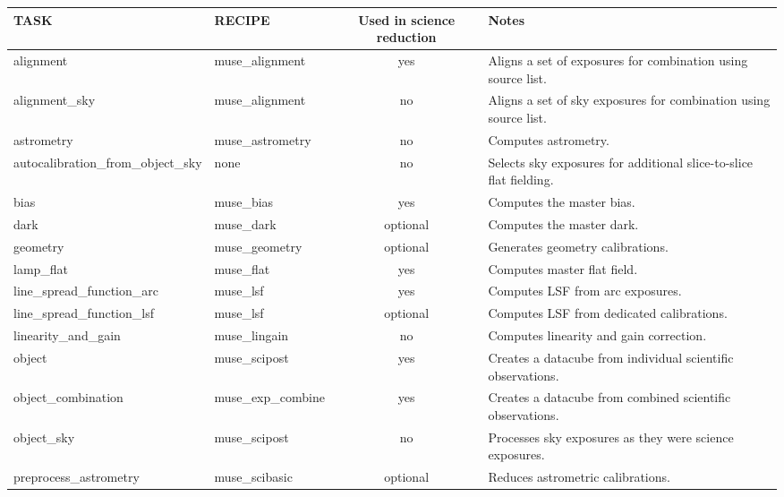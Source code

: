 \begin{table}[htbp]
\centering
\scriptsize
\begin{tabular}{|l|l|c|p{7cm}|}
\hline
\textbf{TASK} & \textbf{RECIPE} & \textbf{Used in science reduction} & \textbf{Notes} \\
\hline 
alignment                          & muse\_alignment     & yes      & Aligns a set of exposures for combination using source list. \\
alignment\_sky                     & muse\_alignment     & no       & Aligns a set of sky exposures for combination using source list. \\
astrometry                         & muse\_astrometry    & no       & Computes astrometry. \\
autocalibration\_from\_object\_sky & none                & no       & Selects sky exposures for additional slice-to-slice flat fielding. \\
bias                               & muse\_bias          & yes      & Computes the master bias. \\
dark                               & muse\_dark          & optional & Computes the master dark. \\
geometry                           & muse\_geometry      & optional & Generates geometry calibrations. \\
lamp\_flat                         & muse\_flat          & yes      & Computes master flat field. \\
line\_spread\_function\_arc        & muse\_lsf           & yes      & Computes LSF from arc exposures. \\
line\_spread\_function\_lsf        & muse\_lsf           & optional & Computes LSF from dedicated calibrations. \\
linearity\_and\_gain               & muse\_lingain       & no       & Computes linearity and gain correction. \\
object                             & muse\_scipost       & yes      & Creates a datacube from individual scientific observations. \\
object\_combination                & muse\_exp\_combine  & yes      & Creates a datacube from combined scientific observations. \\
object\_sky                        & muse\_scipost       & no       & Processes sky exposures as they were science exposures. \\
preprocess\_astrometry             & muse\_scibasic      & optional & Reduces astrometric calibrations. \\

\end{tabular}
\end{table}
